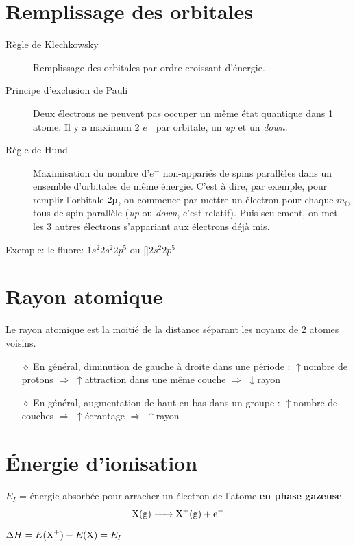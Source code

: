 \section{Remplissage des orbitales}
\begin{description}
  \item[Règle de Klechkowsky]
    Remplissage des orbitales par ordre croissant d'énergie.
  \item[Principe d'exclusion de Pauli]
    Deux électrons ne peuvent pas occuper un même état quantique dans 1 atome.
    Il y a maximum 2 $e^-$ par orbitale, un {\em up} et un {\em down}.
  \item[Règle de Hund]
    Maximisation du nombre d'$e^-$ non-appariés de spins parallèles dans un ensemble d'orbitales de même énergie.
    C'est à dire, par exemple, pour remplir l'orbitale $2\mathrm{p}$,
    on commence par mettre un électron pour chaque $m_l$, tous de spin parallèle
    ({\em up} ou {\em down}, c'est relatif).
    Puis seulement, on met les 3 autres électrons s'appariant aux électrons déjà mis.
\end{description}

Exemple: le fluore:  $1s^2 2s^2 2p^5$ ou []$2s^2 2p^5$


\section{Rayon atomique}
Le rayon atomique est la moitié de la distance séparant les noyaux de 2 atomes voisins.
\begin{itemize}
  \item[$\diamond$]En général, diminution de gauche à droite dans une période :
  $\uparrow$nombre de protons $\Rightarrow$ $\uparrow$attraction dans une même couche $\Rightarrow$  $\downarrow$rayon
  \item[$\diamond$]En général, augmentation de haut en bas dans un groupe :
  $\uparrow$nombre de couches $\Rightarrow$ $\uparrow$écrantage $\Rightarrow$ $\uparrow$rayon
\end{itemize}

\section{\'Energie d'ionisation}
\label{sec:ioni}

$E_I$ = énergie absorbée pour arracher un électron de l'atome \textbf{en phase gazeuse}.
$$\ce{X(g) -> X+(g) + e-}$$

$\Delta H = E(\ce{X^+})-E(\ce{X}) = E_I$

